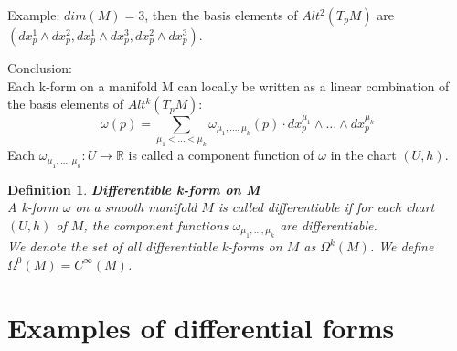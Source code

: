 \documentclass[11pt]{book} %
\newtheorem{definition}{Definition}[section]
\begin{document}
Example: $dim(M) = 3$, then the basis elements of $Alt^2(T_pM)$ are $(dx_p^1 \wedge dx_p^2, dx_p^1 \wedge dx_p^3, dx_p^2 \wedge dx_p^3)$.

\bigbreak

Conclusion: \\
Each k-form on a manifold M can locally be written as a linear combination of the basis elements of $Alt^k(T_pM)$:
\begin{equation*}
    \omega(p) = \sum_{\mu_1 < \ldots < \mu_k} \omega_{\mu_1, \ldots, \mu_k}(p) \cdot dx_p^{\mu_1} \wedge \ldots \wedge dx_p^{\mu_k}
\end{equation*}
Each $\omega_{\mu_1, \ldots, \mu_k} : U \to \mathbb{R}$ is called a component function of $\omega$ in the chart $(U, h)$.

\begin{definition}{\textbf{Differentible k-form on M}} \\
    A k-form $\omega$ on a smooth manifold \( M \) is called differentiable if for each chart $(U, h)$ of \( M \), 
    the component functions $\omega_{\mu_1, \ldots, \mu_k}$ are differentiable. \\
    We denote the set of all differentiable k-forms on \( M \) as \( \Omega^k(M) \).
    We define \( \Omega^0(M) = C^{\infty}(M) \).
\end{definition}




\section{Examples of differential forms}
\end{document}
